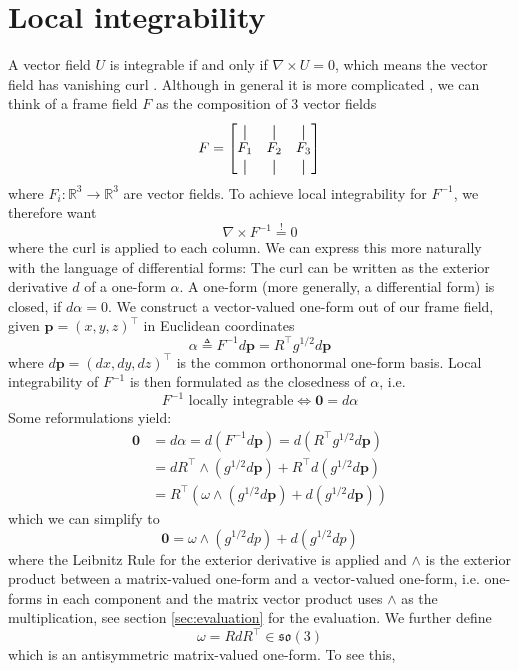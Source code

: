 \documentclass[../thesis.tex]{subfiles}
\begin{document}
\section{Local integrability}
A vector field $U$ is integrable if and only if $\nabla \times U = 0$,
which means the vector field has vanishing curl \cite{Pap20}.
Although in general it is more complicated \cite{Nieser}, we can think of a frame field $F$ as the composition of 3 vector fields
$$F = \begin{bmatrix}
  \vertbar & \vertbar & \vertbar \\
  F_1 & F_2 & F_3 \\
  \vertbar & \vertbar & \vertbar
\end{bmatrix}$$
where $F_i : \mathbb{R}^3 \to \mathbb{R}^3$ are vector fields.
To achieve local integrability for $F^{-1}$, we therefore want
$$\nabla \times F^{-1} \overset{!}{=}0$$
where the curl is applied to each column.
We can express this more naturally with the language of differential forms:
The curl can be written as the exterior derivative $d$ of a one-form $\alpha$.
A one-form (more generally, a differential form) is closed, if $d\alpha = 0$.
We construct a vector-valued one-form out of our frame field,
given $\bm{p}=(x,y,z)^{\top}$ in Euclidean coordinates
$$\alpha \triangleq F^{-1}d\bm{p} = R^{\top}g^{1/2}d\bm{p}$$
where $d\bm{p} = (dx,dy,dz)^{\top}$ is the common orthonormal one-form basis.
Local integrability of $F^{-1}$ is then formulated as the closedness of $\alpha$, i.e.
$$F^{-1} \text{ locally integrable} \iff \bm{0} = d\alpha$$
Some reformulations yield:
\begin{align*}
  \bm{0} &= d\alpha = d(F^{-1}d\bm{p}) = d(R^{\top}g^{1/2}d\bm{p})\\
  &= dR^{\top} \wedge  (g^{1/2}d\bm{p}) + R^{\top}d(g^{1/2}d\bm{p}) \\
  &= R^{\top}(\omega \wedge (g^{1/2}d\bm{p})+ d(g^{1/2}d\bm{p}))
\end{align*}
which we can simplify to
\begin{equation}\label{eq:oneform}
  \bm{0} = \omega \wedge (g^{1/2}dp)+ d(g^{1/2}dp)
\end{equation}
where the Leibnitz Rule for the exterior derivative is applied
and $\wedge$ is the exterior product between a matrix-valued one-form and a vector-valued one-form,
i.e. one-forms in each component and the matrix vector product uses $\wedge$
as the multiplication, see section \ref{sec:evaluation} for the evaluation.
We further define
$$\omega = RdR^{\top} \in \mathfrak{so}(3)$$
which is an antisymmetric matrix-valued one-form. To see this, 
\end{document}

